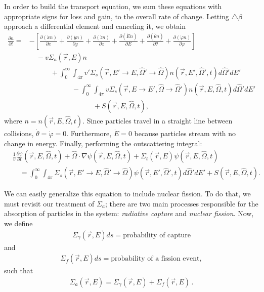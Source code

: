 \documentclass[12pt]{article}
\newcommand{\rvec}{\ensuremath{\vec{r}}}
\newcommand{\omvec}{\ensuremath{\hat{\Omega}}}
\begin{document}
 In order to build the transport equation, we sum these equations with appropriate signs
for loss and gain, to the overall rate of change. Letting $\triangle \beta$ approach a differential
element and canceling it, we obtain
\begin{align}
\frac{\partial n}{\partial t} =& -\left[\frac{\partial (\dot x n)}{\partial x} +
\frac{\partial (\dot y n)}{\partial y}+\frac{\partial (\dot z n)}{\partial z} +
\frac{\partial (\dot E n)}{\partial E}+\frac{\partial (\dot \theta n)}{\partial \theta}+
\frac{\partial (\dot \varphi n)}{\partial \varphi}\right] 
\\ & \quad - v\Sigma_a(\rvec,E)n \nonumber
 \\& \quad\quad\quad   + 
\int_0^{\infty}\int_{4\pi}v'\Sigma_s(\rvec, E'\rightarrow E,\omvec'\rightarrow\omvec)n(\rvec,E',\omvec',t) d\omvec'dE'\nonumber 
\\& \quad\quad\quad\quad\quad\quad -\int_0^{\infty}\int_{4\pi}v\Sigma_s(\rvec, E\rightarrow E',\omvec\rightarrow\omvec')n(\rvec,E,\omvec,t) d\omvec'dE'\nonumber
\\& \quad\quad\quad\quad\quad\quad\quad\quad\quad
+S(\rvec,E,\omvec,t),\nonumber
\end{align}
 where $n = n(\rvec,E,\omvec,t)$. Since particles travel in a straight line
between collisions, \linebreak
$\dot \theta = \dot \varphi = 0$. Furthermore, $\dot E = 0$ because particles stream
with no change in energy. Finally, performing the outscattering integral:
\begin{align}
&\frac{1}{v}\frac{\partial \psi}{\partial t}(\rvec,E,\omvec,t) + \omvec\cdot  \nabla \psi(\rvec,E,\omvec,t) +
 \Sigma_t(\rvec,E)\psi(\rvec,E,\omvec,t)
\\& \quad =
\int_0^{\infty}\int_{4\pi}\Sigma_s(\rvec, E'\rightarrow E,\omvec'\rightarrow\omvec)
\psi(\rvec,E',\omvec',t)d\omvec'dE'+S(\rvec, E, \omvec,t) \nonumber.
\end{align}

We can easily generalize this equation to include nuclear fission.
To do that, we must revisit our treatment of $\Sigma_a$; there are two main processes responsible for the absorption of particles in the system: \textit{radiative capture} and \textit{nuclear fission}. Now, we define
\begin{align*}
\Sigma_\gamma(\rvec,E)ds = \textrm{probability of capture}
\end{align*}
and
\begin{align*}
\Sigma_f(\rvec,E)ds = \textrm{probability of a fission event},
\end{align*}
such that
\begin{align*}
\Sigma_a(\rvec,E) = \Sigma_\gamma(\rvec,E) + \Sigma_f(\rvec,E)\,.
\end{align*}
\end{document}
